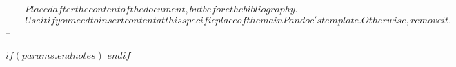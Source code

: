 $-- Placed after the content of the document, but before the bibliography.
$-- %
$-- Use it if you need to insert content at this specific place of the main Pandoc's template. Otherwise, remove it.
$-- %

$if(params.endnotes)$
\theendnotes
$endif$